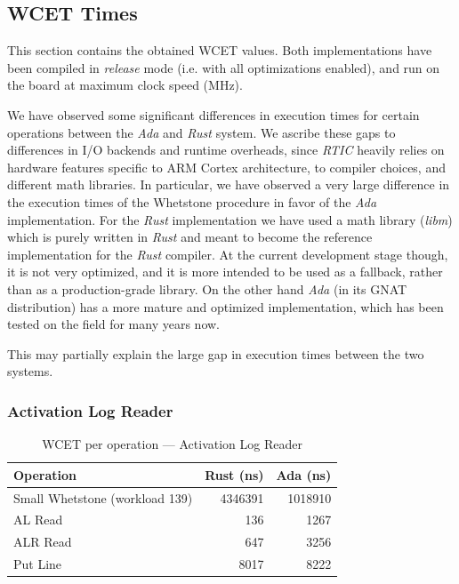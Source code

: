 \subsection{WCET Times}

This section contains the obtained WCET values. Both implementations have been
compiled in \textit{release} mode (i.e. with all optimizations enabled), and run
on the board at maximum clock speed (\unit[168]{MHz}). 

We have observed some significant differences in execution times for certain
operations between the \textit{Ada} and \textit{Rust} system. We ascribe these
gaps to differences in I/O backends and runtime overheads, since \textit{RTIC}
heavily relies on hardware features specific to ARM Cortex architecture, to
compiler choices, and different math libraries. 
\label{lab:wcet-differences-ada-rust}
In particular, we have observed a very large difference in the execution times
of the Whetstone procedure in favor of the \textit{Ada} implementation. For the
\textit{Rust} implementation we have used a math library (\textit{libm}) which
is purely written in \textit{Rust} and meant to become the reference
implementation for the \textit{Rust} compiler. At the current development stage
though, it is not very optimized, and it is more intended to be used as a fallback,
rather than as a production-grade library.  
On the other hand \textit{Ada} (in its GNAT distribution) has a more mature and
optimized implementation, which has been tested on the field for many years now. 

This may partially explain the large gap in execution times between the two
systems.

\subsubsection{Activation Log Reader}
\begin{table}[H]
  \centering
  \begin{tabular*}{\linewidth}{@{\extracolsep{\fill}}lrr@{}}
    \toprule
    \textbf{Operation} & \textbf{Rust (\unit{ns})} & \textbf{Ada (\unit{ns})} \\
    \midrule
    Small Whetstone (workload 139) & 4346391 & 1018910 \\
    AL Read & 136 & 1267 \\
    ALR Read & 647 & 3256 \\
    Put Line & 8017 & 8222 \\
    \bottomrule
  \end{tabular*}
  \caption{WCET per operation — Activation Log Reader}
  \label{tab:wcet-activation-log-reader}
\end{table}

